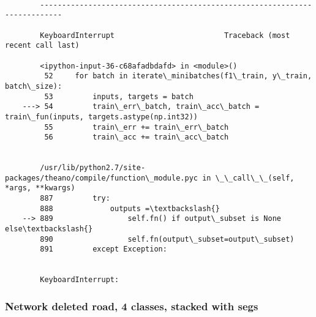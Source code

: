 \documentclass{article}
\begin{document}
    \begin{Verbatim}[commandchars=\\\{\}]

        ---------------------------------------------------------------------------

        KeyboardInterrupt                         Traceback (most recent call last)

        <ipython-input-36-c68afadbdafd> in <module>()
         52     for batch in iterate\_minibatches(f1\_train, y\_train, batch\_size):
         53         inputs, targets = batch
    ---> 54         train\_err\_batch, train\_acc\_batch = train\_fun(inputs, targets.astype(np.int32))
         55         train\_err += train\_err\_batch
         56         train\_acc += train\_acc\_batch
    

        /usr/lib/python2.7/site-packages/theano/compile/function\_module.pyc in \_\_call\_\_(self, *args, **kwargs)
        887         try:
        888             outputs =\textbackslash{}
    --> 889                 self.fn() if output\_subset is None else\textbackslash{}
        890                 self.fn(output\_subset=output\_subset)
        891         except Exception:
    

        KeyboardInterrupt: 

    \end{Verbatim}

    \subsubsection{Network deleted road, 4 classes, stacked with
segs}\label{network-deleted-road-4-classes-stacked-with-segs}
\end{document}

